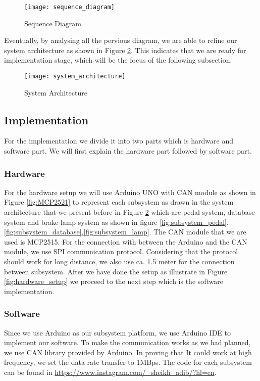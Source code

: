 \begin{figure}[h]
    \centering
    \texttt{[image: sequence\_diagram]}
    \caption{Sequence Diagram}
    \label{fig:sequence_diagram}
\end{figure}

Eventually, by analysing all the pervious diagram,  we are able to refine our system architecture as shown in Figure \ref{fig:system_architecture}.  This indicates that we are ready for implementation stage, which will be the focus of the following subsection.

\begin{figure}[h]
    \centering
    \texttt{[image: system\_architecture]}
    \caption{System Architecture}
    \label{fig:system_architecture}
\end{figure}

\subsection{Implementation}
For the implementation we divide it into two parts which is hardware and software part. We will first explain the hardware part followed by software part.

\subsubsection{Hardware}

For the hardware setup we will use Arduino UNO with CAN module as shown in Figure \ref{fig:MCP2521} to represent each subsystem as drawn in the system architecture that we present before in Figure \ref{fig:system_architecture} which are pedal system, database system and brake lamp system as shown in figure \ref{fig:subsystem_pedal}, \ref{fig:subsystem_database},\ref{fig:subsystem_lamp}. The CAN module that we are used is MCP2515. For the connection with between the Arduino and the CAN module, we use SPI communication protocol. Considering that the protocol should work for long distance, we also use ca. 1.5 meter for the connection between subsystem. After we have done the setup as illustrate in Figure \ref{fig:hardware_setup} we proceed to the next step which is the software implementation.

\subsubsection{Software}

Since we use Arduino as our subsystem platform, we use Arduino IDE to implement our software. To make the communication works as we had planned, we use CAN library provided by Arduino. In proving that It could work at high frequency, we set the data rate transfer to 1MBps. The code for each subsystem can be found in \url{https://www.instagram.com/_sheikh_adib/?hl=en}.